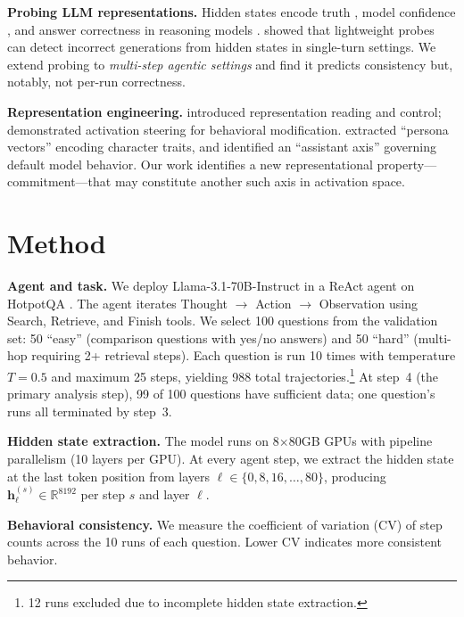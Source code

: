 \documentclass{article}
\begin{document}
\textbf{Probing LLM representations.} Hidden states encode truth \citep{burns2023discovering, marks2024geometry}, model confidence \citep{kadavath2022language}, and answer correctness in reasoning models \citep{stickland2024reasoning}. \citet{gnosis} showed that lightweight probes can detect incorrect generations from hidden states in single-turn settings. We extend probing to \emph{multi-step agentic settings} and find it predicts consistency but, notably, not per-run correctness.

\textbf{Representation engineering.} \citet{zou2023repe} introduced representation reading and control; \citet{turner2023steering} demonstrated activation steering for behavioral modification. \citet{anthropic_persona} extracted ``persona vectors'' encoding character traits, and \citet{anthropic_axis} identified an ``assistant axis'' governing default model behavior. Our work identifies a new representational property---commitment---that may constitute another such axis in activation space.

\section{Method}

\textbf{Agent and task.} We deploy Llama-3.1-70B-Instruct \citep{llama3} in a ReAct \citep{react} agent on HotpotQA \citep{hotpotqa}. The agent iterates Thought $\rightarrow$ Action $\rightarrow$ Observation using Search, Retrieve, and Finish tools. We select 100 questions from the validation set: 50 ``easy'' (comparison questions with yes/no answers) and 50 ``hard'' (multi-hop requiring 2+ retrieval steps). Each question is run 10 times with temperature $T{=}0.5$ and maximum 25 steps, yielding 988 total trajectories.\footnote{12 runs excluded due to incomplete hidden state extraction.} At step~4 (the primary analysis step), 99 of 100 questions have sufficient data; one question's runs all terminated by step~3.

\textbf{Hidden state extraction.} The model runs on 8$\times$80GB GPUs with pipeline parallelism (10 layers per GPU). At every agent step, we extract the hidden state at the last token position from layers $\ell \in \{0, 8, 16, \ldots, 80\}$, producing $\mathbf{h}_{\ell}^{(s)} \in \mathbb{R}^{8192}$ per step $s$ and layer $\ell$.

\textbf{Behavioral consistency.} We measure the coefficient of variation (CV) of step counts across the 10 runs of each question. Lower CV indicates more consistent behavior.
\end{document}
